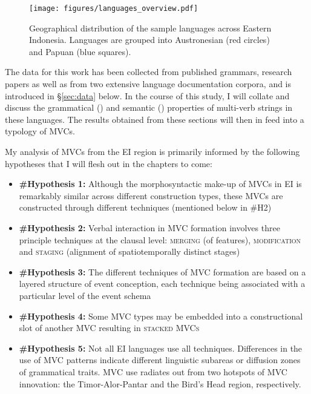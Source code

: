 \begin{sidewaysfigure}
\texttt{[image: figures/languages\_overview.pdf]}
\caption[Geographical distribution of sample languages]{Geographical distribution of the sample languages across Eastern Indonesia. Languages are grouped into Austronesian (red circles) and Papuan (blue squares).}\label{map:overview}
\end{sidewaysfigure}

The data for this work has been collected from published grammars, research papers as well as from two extensive language documentation corpora, and is introduced in §\ref{sec:data} below. In the course of this study, I will collate and discuss the grammatical () and semantic () properties of multi-verb strings in these languages. The results obtained from these sections will then in  feed into a typology of MVCs. 

My analysis of MVCs from the EI region is primarily informed by the following hypotheses that I will flesh out in the chapters to come:

\begin{footnotesize}
\begin{itemize}
\item \textbf{\#Hypothesis 1:} Although the morphosyntactic make-up of MVCs in EI is remarkably similar across different construction types, these MVCs are constructed through different techniques (mentioned below in \#H2)
\item \textbf{\#Hypothesis 2:} Verbal interaction in MVC formation involves three principle techniques at the clausal level: \textsc{merging} (of features), \textsc{modification} and \textsc{staging} (alignment of spatiotemporally distinct stages)
\item \textbf{\#Hypothesis 3:} The different techniques of MVC formation are based on a layered structure of event conception, each technique being associated with a particular level of the event schema
\item \textbf{\#Hypothesis 4:} Some MVC types may be embedded into a constructional slot of another MVC resulting in \textsc{stacked MVCs}
\item \textbf{\#Hypothesis 5:} Not all EI languages use all techniques. Differences in the use of MVC patterns indicate different linguistic subareas or diffusion zones of grammatical traits. MVC use radiates out from two hotspots of MVC innovation: the Timor-Alor-Pantar and the Bird's Head region, respectively.
\end{itemize}
\end{footnotesize}

